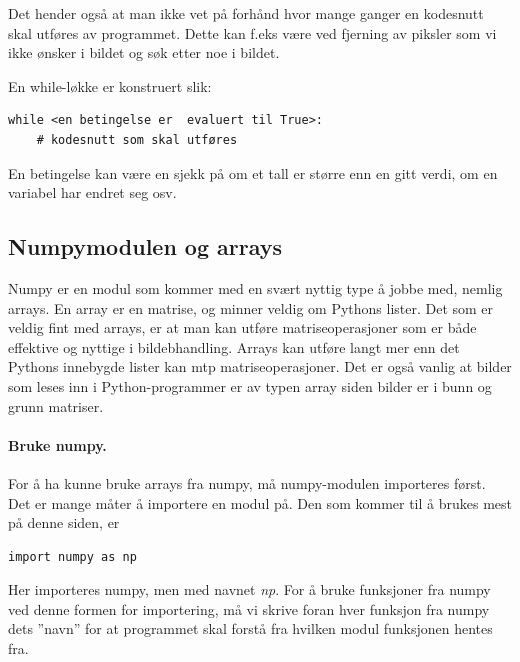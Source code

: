 \documentclass[%
oneside,                 %
final,                   %
10pt]{article}
\begin{document}
\vspace{3mm}


Det hender også at man ikke vet på forhånd hvor mange ganger en kodesnutt skal utføres av programmet. Dette kan f.eks være ved fjerning av piksler som vi ikke ønsker i bildet og søk etter noe i bildet.

En while-løkke er konstruert slik:
\begin{verbatim}
while <en betingelse er  evaluert til True>:
    # kodesnutt som skal utføres
\end{verbatim}

En betingelse kan være en sjekk på om et tall er større enn en gitt verdi, om en variabel har endret seg osv.

\subsection{Numpymodulen og arrays}

Numpy er en modul som kommer med en svært nyttig type å jobbe med, nemlig arrays.
En array er en matrise, og minner veldig om Pythons lister. Det som er veldig fint med arrays, er at man kan utføre
matriseoperasjoner som er både effektive og nyttige i bildebhandling. Arrays kan utføre langt mer enn det Pythons innebygde lister kan mtp matriseoperasjoner.
Det er også vanlig at bilder som leses inn i Python-programmer
er av typen array siden bilder er i bunn og grunn matriser.

\paragraph{Bruke numpy.}
For å ha kunne bruke arrays fra numpy, må numpy-modulen importeres først.
Det er mange måter å importere en modul på.
Den som kommer til å brukes mest på denne siden, er
\begin{verbatim}
import numpy as np
\end{verbatim}
Her importeres numpy, men med navnet \emph{np}. For å bruke funksjoner fra numpy ved denne formen for importering, må vi
skrive foran hver funksjon fra numpy dets ''navn'' for at programmet skal forstå fra hvilken modul funksjonen hentes fra.
\end{document}
